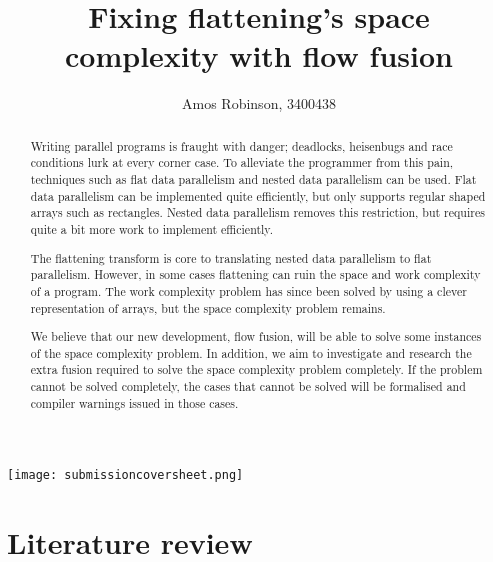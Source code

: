 \documentclass[12pt,a4paper]{article}
\author{Amos Robinson, 3400438}
\title{Fixing flattening's space complexity with flow fusion}
\begin{document}
\maketitle
\thispagestyle{fancy}

\begin{abstract}
Writing parallel programs is fraught with danger; deadlocks, heisenbugs and race conditions lurk at every corner case.
To alleviate the programmer from this pain, techniques such as flat data parallelism and nested data parallelism can be used.
Flat data parallelism can be implemented quite efficiently, but only supports regular shaped arrays such as rectangles.
Nested data parallelism removes this restriction, but requires quite a bit more work to implement efficiently.

The flattening transform is core to translating nested data parallelism to flat parallelism.
However, in some cases flattening can ruin the space and work complexity of a program.
The work complexity problem has since been solved by using a clever representation of arrays, but the space complexity problem remains.

We believe that our new development, flow fusion, will be able to solve some instances of the space complexity problem.
In addition, we aim to investigate and research the extra fusion required to solve the space complexity problem completely.
If the problem cannot be solved completely, the cases that cannot be solved will be formalised and compiler warnings issued in those cases.
\end{abstract}
\pagebreak

\onehalfspacing
\tableofcontents

\newcommand{\nesl}{{\sc Nesl}\xspace}
\newcommand{\vcode}{{\sc Vcode}\xspace}

\texttt{[image: submissioncoversheet.png]}



\pagebreak
\section{Literature review}



\end{document}
